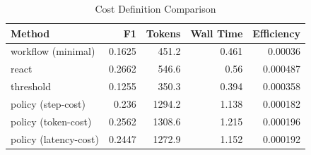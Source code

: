 \begin{table}[t]
\centering
\small
\caption{Cost Definition Comparison}
\begin{tabular}{lrrrr}
\hline
Method & F1 & Tokens & Wall Time & Efficiency \\
\hline
workflow (minimal) & 0.1625 & 451.2 & 0.461 & 0.00036 \\
react & 0.2662 & 546.6 & 0.56 & 0.000487 \\
threshold & 0.1255 & 350.3 & 0.394 & 0.000358 \\
policy (step-cost) & 0.236 & 1294.2 & 1.138 & 0.000182 \\
policy (token-cost) & 0.2562 & 1308.6 & 1.215 & 0.000196 \\
policy (latency-cost) & 0.2447 & 1272.9 & 1.152 & 0.000192 \\
\hline
\end{tabular}
\end{table}
